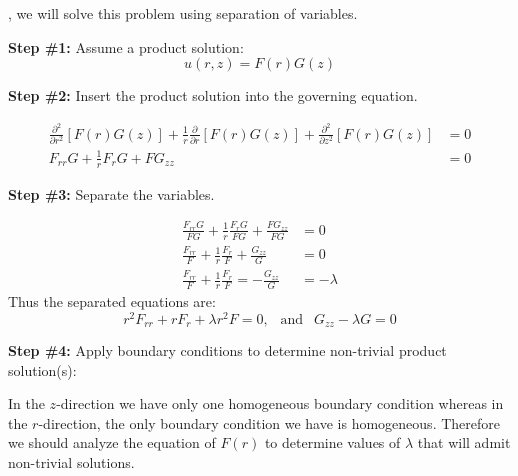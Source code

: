 , we will solve this problem using separation of variables.

\vspace{0.25cm}

\noindent\textbf{Step \#1:} Assume a product solution:
\begin{equation*}
u(r,z) = F(r)G(z)
\end{equation*}

\vspace{5.0cm}

\noindent\textbf{Step \#2:} Insert the product solution into the governing equation.

\begin{align*}
\frac{\partial^2}{\partial r^2}\left[F(r)G(z) \right] + \frac{1}{r}\frac{\partial}{\partial r}\left[F(r) G(z)\right] + \frac{\partial^2}{\partial z^2}\left[ F(r)G(z)\right] &= 0 \\
F_{rr}G + \frac{1}{r}F_rG + FG_{zz} &= 0
\end{align*}

\vspace{0.15cm}

\noindent\textbf{Step \#3:} Separate the variables.

\begin{align*}
\frac{F_{rr}G}{FG} + \frac{1}{r}\frac{F_r G}{FG} + \frac{FG_{zz}}{FG} &= 0 \\
\frac{F_{rr}}{F} + \frac{1}{r}\frac{F_r}{F} + \frac{G_{zz}}{G} &= 0 \\
\frac{F_{rr}}{F} + \frac{1}{r}\frac{F_r}{F} = -\frac{G_{zz}}{G} &= -\lambda
\end{align*}
Thus the separated equations are:
\begin{equation*}
r^2F_{rr} + rF_r + \lambda r^2 F = 0, \ \ \text{ and } \ \ G_{zz} - \lambda G = 0
\end{equation*}

\noindent\textbf{Step \#4:} Apply boundary conditions to determine non-trivial product solution(s):

\vspace{0.05cm}

\noindent In the $z$-direction we have only one homogeneous boundary condition whereas in the $r$-direction, the only boundary condition we have is homogeneous.  Therefore we should analyze the equation of $F(r)$ to determine values of $\lambda$ that will admit non-trivial solutions.

